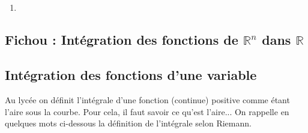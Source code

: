 \documentclass[12pt, class=report,crop=false]{standalone}
\begin{document}
\subsection{}


\subsection{}


\subsection{}
 
 
\begin{miniexercices}
\sauteligne
\begin{enumerate}
  \item 
\end{enumerate}
\end{miniexercices}

\subsection{Fichou : Intégration des fonctions de $\mathbb{R}^n$ dans $\mathbb{R}$}


\subsection{Intégration des fonctions d'une variable}
Au lycée on définit l'intégrale d'une fonction (continue) positive comme étant l'aire sous la courbe. Pour cela, il faut savoir ce qu'est l'aire... On rappelle en quelques mots ci-dessous la définition de l'intégrale selon Riemann.
\end{document}
